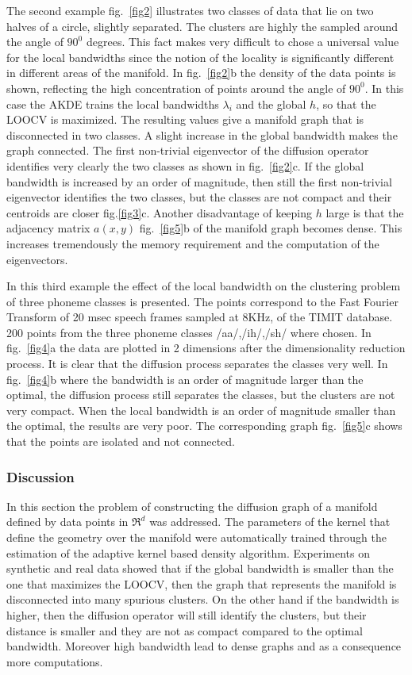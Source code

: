 \documentclass[12pt,letterpaper,doublespaced,ETD,dvips,proposal]{gtthesis}
\begin{document}
\begin{Body}
The second example fig.~\ref{fig2} illustrates two classes of data
that lie on two halves of a circle, slightly separated. The clusters
are highly the sampled around the angle  of $90^0$ degrees. This
fact makes very difficult to chose a universal value for the local
bandwidths since the notion of the locality is significantly
different in different areas of the manifold. In fig.~\ref{fig2}b
the  density of the data points is shown, reflecting the high
concentration of points around the angle of $90^0$. In this case the
AKDE trains the local bandwidths $\lambda_i$ and the global $h$, so
that the LOOCV is maximized. The resulting values give a manifold
graph that is disconnected in two classes. A  slight increase in the
global bandwidth makes the graph connected.  The first non-trivial
eigenvector of the diffusion operator identifies very clearly the
two classes as shown in fig.~\ref{fig2}c. If the global bandwidth is
increased by an order of magnitude, then still the first non-trivial
eigenvector identifies the two classes, but the classes are not
compact and their centroids are closer fig.\ref{fig3}c. Another
disadvantage of keeping $h$ large is that the adjacency matrix
$a(x,y)$ fig.~\ref{fig5}b of the manifold graph becomes dense. This
increases tremendously the memory requirement and the computation of
the eigenvectors.

In this third example the effect of the local bandwidth on the
clustering problem of three phoneme classes is presented. The points
correspond to the Fast Fourier Transform of 20 msec speech frames
sampled at 8KHz, of the TIMIT database. 200 points from the three
phoneme classes /aa/,/ih/,/sh/ where chosen. In fig.~\ref{fig4}a the
data are plotted in 2 dimensions after the dimensionality reduction
process. It is clear that the diffusion process separates the
classes very well. In fig.~\ref{fig4}b where the bandwidth is an
order of magnitude larger than the optimal, the diffusion process
still separates the  classes, but the clusters are not very compact.
When the local bandwidth is an order of magnitude smaller than the
optimal, the results are very poor. The corresponding graph
fig.~\ref{fig5}c shows that the points are isolated and not
connected.




\subsubsection{Discussion} In this section the problem of constructing
the diffusion graph of a manifold defined by data points in $\Re^d$
was addressed. The parameters of the kernel that define the geometry
over the manifold were automatically trained through the estimation
of the adaptive kernel based density  algorithm. Experiments on
synthetic and real data showed that  if the global bandwidth is
smaller than the one that maximizes the LOOCV, then the graph that
represents the manifold is disconnected into  many spurious
clusters. On the other hand if the bandwidth is higher, then the
diffusion operator will still identify the clusters, but their
distance is smaller and they are not as compact compared to the
optimal bandwidth. Moreover high bandwidth lead to dense graphs and
as a consequence more computations.


\end{Body}
\end{document}
